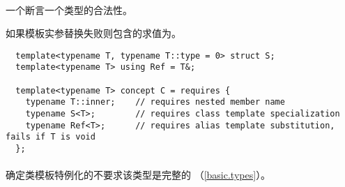 
\paragraph{} %
一个断言一个类型的合法性。

\begin{note}
  如果模板实参替换失败则包含的求值为。
\end{note}

\begin{example}
  \begin{lstlisting}
  template<typename T, typename T::type = 0> struct S;
  template<typename T> using Ref = T&;

  template<typename T> concept C = requires {
    typename T::inner;    // requires nested member name
    typename S<T>;        // requires class template specialization
    typename Ref<T>;      // requires alias template substitution, fails if T is void
  };
  \end{lstlisting}
\end{example}

\paragraph{} %
确定类模板特例化的不要求该类型是完整的
（\ref{basic.types}）。
